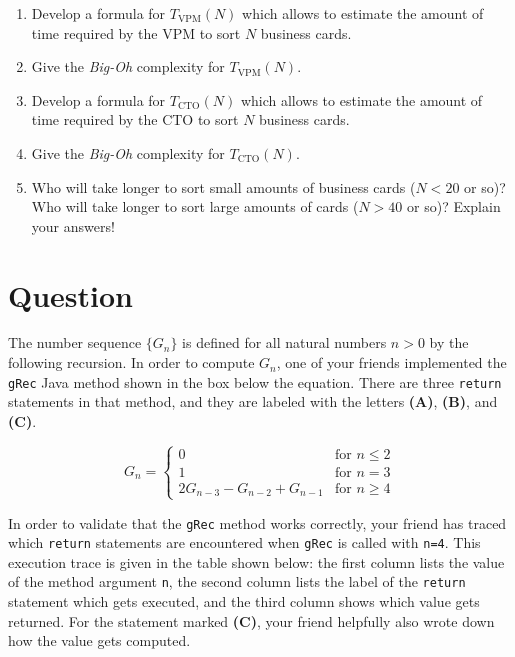 \documentclass[a4paper]{article}
\newcounter{question}
\newcommand{\question}{\refstepcounter{question}\section*{Question~\thequestion}}
\renewcommand*\thequestion{\arabic{question}}
\begin{document}
\begin{enumerate}
\item
  Develop a formula for $T_\text{VPM}(N)$ which allows to estimate the amount of time required by the VPM to sort $N$ business cards.
\item
  Give the \emph{Big-Oh} complexity for $T_\text{VPM}(N)$.
\item
  Develop a formula for $T_\text{CTO}(N)$ which allows to estimate the amount of time required by the CTO to sort $N$ business cards.
\item
  Give the \emph{Big-Oh} complexity for $T_\text{CTO}(N)$.
\item
  Who will take longer to sort small amounts of business cards ($N<20$ or so)?
  Who will take longer to sort large amounts of cards ($N>40$ or so)?
  Explain your answers!
\end{enumerate}

\clearpage

\question
\label{q:recursion-and-dp}

The number sequence $\{G_n\}$ is defined for all natural numbers $n>0$ by the following recursion.
In order to compute $G_n$, one of your friends implemented the \texttt{gRec} Java method shown in the box below the equation.
There are three \texttt{return} statements in that method, and they are labeled with the letters \textbf{(A)}, \textbf{(B)}, and \textbf{(C)}.

\begin{equation*}
  G_n =
  \begin{cases}
    0 &\text{for } n \le 2 \\
    1 &\text{for } n = 3 \\
    2G_{n-3} - G_{n-2} + G_{n-1} &\text{for } n \ge 4
  \end{cases}
\end{equation*}

\begin{center}
\end{center}

In order to validate that the \texttt{gRec} method works correctly, your friend has traced which \texttt{return} statements are encountered when \texttt{gRec} is called with \texttt{n=4}.
This execution trace is given in the table shown below:
the first column lists the value of the method argument \texttt{n},
the second column lists the label of the \texttt{return} statement which gets executed,
and the third column shows which value gets returned.
For the statement marked \textbf{(C)}, your friend helpfully also wrote down how the value gets computed.
\end{document}
